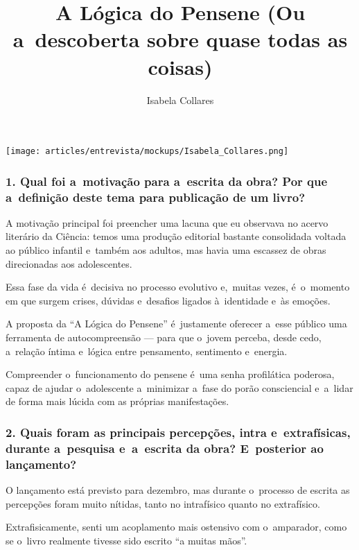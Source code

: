 \documentclass{gescons}
\author{Isabela Collares}
\title{A Lógica do Pensene (Ou a~descoberta sobre quase todas as coisas)}
\begin{document}
    \makeentrevistatitle

    \begin{multicols}{3}

\begin{center}
    \texttt{[image: articles/entrevista/mockups/Isabela\_Collares.png]}
\end{center}
\vspace{-1cm}


\subsubsection{1. Qual foi a~motivação para a~escrita da obra? Por que a~definição deste tema para publicação de um livro?}

\sloppy

A motivação principal foi preencher uma lacuna que eu observava no acervo literário da Ciência: temos uma produção editorial bastante consolidada voltada ao público infantil e~também aos adultos, mas havia uma escassez de obras direcionadas aos adolescentes.

\fussy

Essa fase da vida é~decisiva no processo evolutivo e,~muitas vezes, é~o~momento em que surgem crises, dúvidas e~desafios ligados à~identidade e~às emoções.

A proposta da ``A Lógica do Pensene'' é~justamente oferecer a~esse público uma ferramenta de autocompreensão --- para que o~jovem perceba, desde cedo, a~relação íntima e~lógica entre pensamento, sentimento e~energia.

Compreender o~funcionamento do pensene é~uma senha profilática poderosa, capaz de ajudar o~adolescente a~minimizar a~fase do porão consciencial e~a~lidar de forma mais lúcida com as próprias manifestações.


\subsubsection{2. Quais foram as principais percepções, intra e~extrafísicas, durante a~pesquisa e~a~escrita da obra? E~posterior ao lançamento?}

O lançamento está previsto para dezembro, mas durante o~processo de escrita as percepções foram muito nítidas, tanto no intrafísico quanto no extrafísico.

Extrafisicamente, senti um acoplamento mais ostensivo com o~amparador, como se o~livro realmente tivesse sido escrito ``a muitas mãos''.


\end{multicols}
\end{document}

